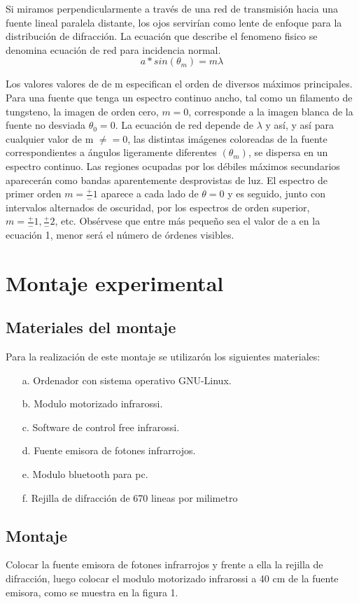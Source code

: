 \documentclass[12]{article}
\begin{document}
\begin{multicols}{2}
Si miramos perpendicularmente a través de una red de transmisión hacia una fuente lineal paralela distante, los ojos servirían como lente de enfoque para la distribución de difracción.
La ecuación que describe el fenomeno fisico se denomina ecuación de red para incidencia normal. 
\begin{equation}
a*sin(\theta _m)= m\lambda 
\end{equation}

Los valores valores de de m especifican el orden de diversos máximos principales. Para una fuente que tenga un espectro continuo ancho, tal como un filamento de tungsteno, la imagen de orden cero, $ m = 0 $, corresponde a la imagen blanca de la fuente no desviada $ \theta _0 = 0 $. La ecuación de red depende de $\lambda$ y así, y así para cualquier valor de m $\ne = 0$, las distintas imágenes coloreadas de la fuente correspondientes a ángulos ligeramente diferentes $(\theta _m)$, se dispersa en un espectro continuo. Las regiones ocupadas por los débiles máximos secundarios aparecerán como bandas aparentemente desprovistas de luz. El espectro de primer orden $m = \frac{+}{-}1$ aparece a cada lado de $\theta = 0$ y es seguido, junto con intervalos alternados de oscuridad, por los espectros de orden superior, $m = \frac{+}{-}1, \frac{+}{-}2$, etc. Obsérvese que entre más pequeño sea el valor de a en la ecuación 1, menor será el número de órdenes visibles. 
\
\section{Montaje experimental}
\subsection{Materiales del montaje}
Para la realización de este montaje se utilizarón los siguientes materiales:
\begin{enumerate}
\item[a.] Ordenador con sistema operativo GNU-Linux.
\item[b.] Modulo motorizado infrarossi.
\item[c.] Software de control free infrarossi.
\item[d.] Fuente emisora de fotones infrarrojos.
\item[e.] Modulo bluetooth para pc.
\item[f.] Rejilla de difracción de 670 lineas por milimetro 
\end{enumerate}

\subsection{Montaje}
Colocar la fuente emisora de fotones infrarrojos y frente a ella la rejilla de difracción, luego colocar el modulo motorizado infrarossi a 40 cm de la fuente emisora, como se muestra en la figura 1. \\ \\


\end{multicols}
\end{document}
